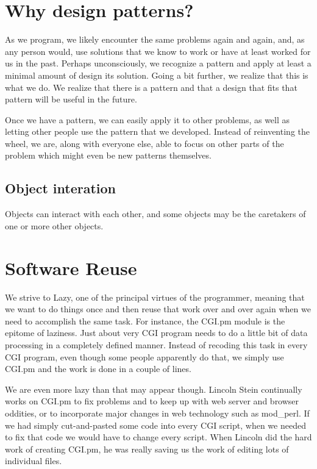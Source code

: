 
    \section{Why design patterns?}

As we program, we likely encounter the same problems again and
again, and, as any person would, use solutions that we know
to work or have at least worked for us in the past.  Perhaps
unconsciously, we recognize a pattern and apply at least a
minimal amount of design its solution.  Going a bit further,
we realize that this is what we do.  We realize that there
is a pattern and that a design that fits that pattern will
be useful in the future.

Once we have a pattern, we can easily apply it to other
problems, as well as letting other people use the pattern
that we developed.  Instead of reinventing the wheel, we are,
along with everyone else, able to focus on other parts of the
problem which might even be new patterns themselves.

        \subsection{Object interation}

Objects can interact with each other, and some objects may be
the caretakers of one or more other objects.

    \section{Software Reuse}

We strive to Lazy, one of the principal virtues of the
programmer, meaning that we want to do things once and then
reuse that work over and over again when we need to accomplish the
same task.  For instance, the CGI.pm module is the epitome of laziness.
Just about very CGI program needs to do a little bit of data
processing in a completely defined manner.  Instead of recoding
this task in every CGI program, even though some people apparently
do that, we simply use CGI.pm and the work is done in a couple of
lines.

We are even more lazy than that may appear though.  Lincoln Stein
continually works on CGI.pm to fix problems and to keep up with
web server and browser oddities, or to incorporate major changes
in web technology such as mod\_perl.  If we had simply cut-and-pasted
some code into every CGI script, when we needed to fix that code
we would have to change every script.  When Lincoln did the hard
work of creating CGI.pm, he was really saving us the work of 
editing lots of individual files.

